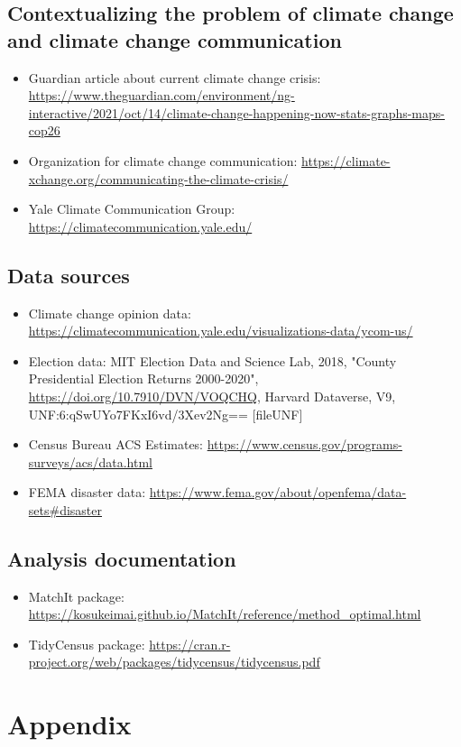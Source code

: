 \documentclass{article}
\begin{document}
\subsection{Contextualizing the problem of climate change and climate change communication}
\begin{itemize}
	\item Guardian article about current climate change crisis: \url{https://www.theguardian.com/environment/ng-interactive/2021/oct/14/climate-change-happening-now-stats-graphs-maps-cop26}
	\item Organization for climate change communication: \url{https://climate-xchange.org/communicating-the-climate-crisis/}
	\item Yale Climate Communication Group: \url{https://climatecommunication.yale.edu/}
\end{itemize}

\subsection{Data sources}
\begin{itemize}
	\item Climate change opinion data: \url{https://climatecommunication.yale.edu/visualizations-data/ycom-us/}
	\item Election data: MIT Election Data and Science Lab, 2018, "County Presidential Election Returns 2000-2020", \url{https://doi.org/10.7910/DVN/VOQCHQ}, Harvard Dataverse, V9, UNF:6:qSwUYo7FKxI6vd/3Xev2Ng== [fileUNF]
	\item Census Bureau ACS Estimates: \url{https://www.census.gov/programs-surveys/acs/data.html}
	\item FEMA disaster data: \url{https://www.fema.gov/about/openfema/data-sets#disaster}
\end{itemize}

\subsection{Analysis documentation}
\begin{itemize}
	\item MatchIt package: \url{https://kosukeimai.github.io/MatchIt/reference/method_optimal.html}
	\item TidyCensus package: \url{https://cran.r-project.org/web/packages/tidycensus/tidycensus.pdf}
\end{itemize}

\newpage
\section{Appendix}
\end{document}
